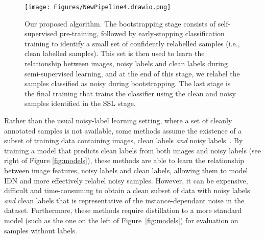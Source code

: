 \documentclass[10pt,twocolumn,letterpaper]{article}
\begin{document}
\begin{figure*}[t!]
    \begin{center}
    \texttt{[image: Figures/NewPipeline4.drawio.png]}
    \end{center}
    \caption{\small Our proposed algorithm. The bootstrapping stage consists of self-supervised pre-training, followed by early-stopping classification training to identify a small set of confidently relabelled samples (i.e., clean labelled samples).
    This set is then used to learn the relationship between images, noisy labels and clean labels during semi-supervised learning, and at the end of this stage, we relabel the samples classified as noisy during bootstrapping. The last stage is the final training that trains the classifier using the clean and noisy samples identified in the SSL stage.}
    \label{fig:methodology}
\end{figure*}

Rather than the usual noisy-label learning setting, where a set of cleanly annotated samples is not available, some methods assume the existence of a subset of training data containing images, clean labels \textit{and} noisy labels~\cite{inoue2017multi,veit2017learning,gu2021instancedependent}. By training a model that predicts clean labels from both images and noisy labels (see right of Figure \ref{fig:models}), these methods are able to learn the relationship between image features, noisy labels and clean labels, allowing them to model IDN and more effectively relabel noisy samples. However, it can be expensive, difficult and time-consuming to obtain a clean subset of data with noisy labels \textit{and} clean labels that is representative of the instance-dependant noise in the dataset. 
Furthermore, these methods require distillation to a more standard model (such as the one on the left of Figure~\ref{fig:models}) for evaluation on samples without labels.
\end{document}
